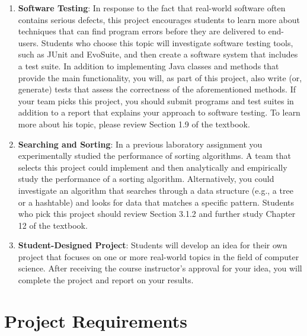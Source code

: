 \begin{enumerate}
  \item {\bf Software Testing}: In response to the fact that real-world software often contains serious defects, this
    project encourages students to learn more about techniques that can find program errors before they are delivered to
    end-users. Students who choose this topic will investigate software testing tools, such as JUnit and EvoSuite, and
    then create a software system that includes a test suite. In addition to implementing Java classes and methods that
    provide the main functionality, you will, as part of this project, also write (or, generate) tests that assess the
    correctness of the aforementioned methods. If your team picks this project, you should submit programs and test
    suites in addition to a report that explains your approach to software testing. To learn more about his topic,
    please review Section 1.9 of the textbook.

  \item {\bf Searching and Sorting}: In a previous laboratory assignment you experimentally studied the performance of
    sorting algorithms. A team that selects this project could implement and then analytically and empirically study the
    performance of a sorting algorithm. Alternatively, you could investigate an algorithm that searches through a data
    structure (e.g., a tree or a hashtable) and looks for data that matches a specific pattern. Students who pick this
    project should review Section 3.1.2 and further study Chapter 12 of the textbook.

  \item {\bf Student-Designed Project}: Students will develop an idea for their own project that focuses on one or more
    real-world topics in the field of computer science. After receiving the course instructor's approval for your idea,
    you will complete the project and report on your results.

\end{enumerate}

\vspace*{-.15in}

\section*{Project Requirements}


